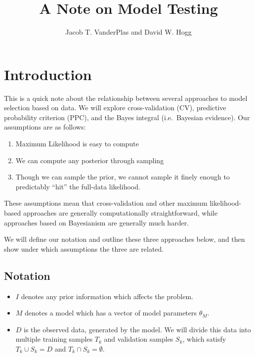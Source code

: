 \documentclass[12pt]{article}
\title{A Note on Model Testing}
\author{Jacob T. VanderPlas and David W. Hogg}
\begin{document}
\maketitle

\section{Introduction}

This is a quick note about the relationship between several approaches to
model selection based on data.  We will explore cross-validation (CV),
predictive probability criterion (PPC), and the Bayes integral
(i.e.~Bayesian evidence).  Our assumptions are as follows:
\begin{enumerate}
  \item Maximum Likelihood is easy to compute
  \item We can compute any posterior through sampling
  \item Though we can sample the prior, we cannot sample it finely enough
    to predictably ``hit'' the full-data likelihood.
\end{enumerate}
These assumptions mean that cross-validation and other maximum likelihood-based
approaches are generally computationally straightforward, while approaches based
on Bayesianism are generally much harder.

We will define our notation and outline these three approaches below, and
then show under which assumptions the three are related.

\subsection{Notation}
\begin{itemize}
  \item $I$ denotes any prior information which affects the problem.
  \item $M$ denotes a model which has a vector of model parameters $\theta_M$.
  \item $D$ is the observed data, generated by the model.
    We will divide this data into multiple training samples $T_k$
    and validation samples $S_k$, which satisfy
    $T_k \cup S_k = D$ and $T_k \cap S_k = \emptyset$.
\end{itemize}
\end{document}
